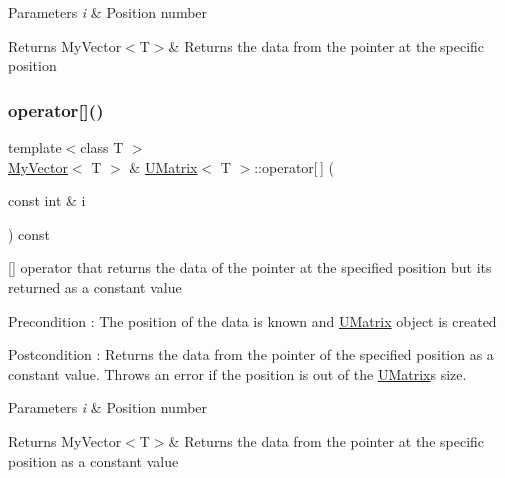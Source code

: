 \begin{DoxyParams}{Parameters}
{\em i} & Position number \\
\hline
\end{DoxyParams}
\begin{DoxyReturn}{Returns}
My\+Vector$<$\+T$>$\& Returns the data from the pointer at the specific position 
\end{DoxyReturn}
\mbox{\label{class_u_matrix_ab0ad5eda96c9a8bb9ca8c69d4bb8d5f8}} 
\subsubsection{\texorpdfstring{operator[]()}{operator[]()}\hspace{0.1cm}{\footnotesize\ttfamily [2/2]}}
{\footnotesize\ttfamily template$<$class T $>$ \\
\mbox{\hyperlink{class_my_vector}{My\+Vector}}$<$ T $>$ \& \mbox{\hyperlink{class_u_matrix}{U\+Matrix}}$<$ T $>$\+::operator\mbox{[}$\,$\mbox{]} (\begin{DoxyParamCaption}\item[{const int \&}]{i }\end{DoxyParamCaption}) const}



\mbox{[}\mbox{]} operator that returns the data of the pointer at the specified position but its returned as a constant value 

\begin{DoxyPrecond}{Precondition}
\+: The position of the data is known and \mbox{\hyperlink{class_u_matrix}{U\+Matrix}} object is created 
\end{DoxyPrecond}
\begin{DoxyPostcond}{Postcondition}
\+: Returns the data from the pointer of the specified position as a constant value. Throws an error if the position is out of the \mbox{\hyperlink{class_u_matrix}{U\+Matrix}}\textquotesingle{}s size. 
\end{DoxyPostcond}

\begin{DoxyParams}{Parameters}
{\em i} & Position number \\
\hline
\end{DoxyParams}
\begin{DoxyReturn}{Returns}
My\+Vector$<$\+T$>$\& Returns the data from the pointer at the specific position as a constant value 
\end{DoxyReturn}
\mbox{\label{class_u_matrix_a57003b0a0f3fe394ab04f9588732a928}} 
